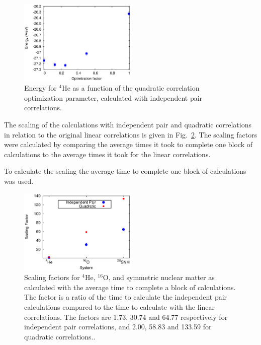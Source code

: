 \begin{figure}[h!]
   \centering
   \includegraphics[width=0.5\textwidth]{quadfact.eps}
   \caption{Energy for $^4$He as a function of the quadratic correlation optimization parameter, calculated with independent pair correlations.}
   \label{fig:quadfact}
\end{figure}
The scaling of the calculations with independent pair and quadratic correlations in relation to the original linear correlations is given in Fig.~\ref{fig:scaling}. The scaling factors were calculated by comparing the average times it took to complete one block of calculations to the average times it took for the linear correlations.



To calculate the scaling the average time to complete one block of calculations was used.
\begin{figure}[h!]
   \centering
   \includegraphics[width=0.5\textwidth]{scaling.eps}
   \caption{Scaling factors for ${}^4$He, ${}^{16}$O, and symmetric nuclear matter as calculated with the average time to complete a block of calculations. The factor is a ratio of the time to calculate the independent pair calculations compared to the time to calculate with the linear correlations. The factors are 1.73, 30.74 and 64.77 respectively for independent pair correlations, and 2.00, 58.83 and 133.59 for quadratic correlations..}
   \label{fig:scaling}
\end{figure}

